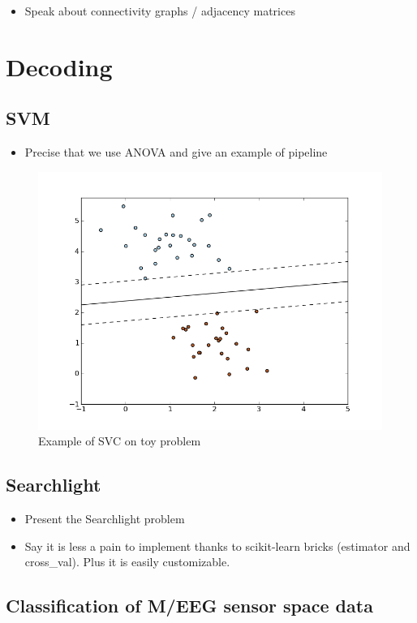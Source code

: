\documentclass{frontiersSCNS} %
\begin{document}
\begin{itemize}
    \item Speak about connectivity graphs / adjacency matrices 
\end{itemize}

\section{Decoding}

\subsection{SVM}

\begin{itemize}
    \item Precise that we use ANOVA and give an example of pipeline
\end{itemize}

\begin{figure}
    \includegraphics[width=.5\linewidth]{img/plot_sgd_separating_hyperplane_1.png}
    \caption{Example of SVC on toy problem}
\end{figure}

\subsection{Searchlight}

\begin{itemize}
    \item Present the Searchlight problem
    \item Say it is less a pain to implement thanks to scikit-learn bricks
        (estimator and cross\_val). Plus it is easily customizable.
\end{itemize}

\subsection{Classification of M/EEG sensor space data}
\end{document}
